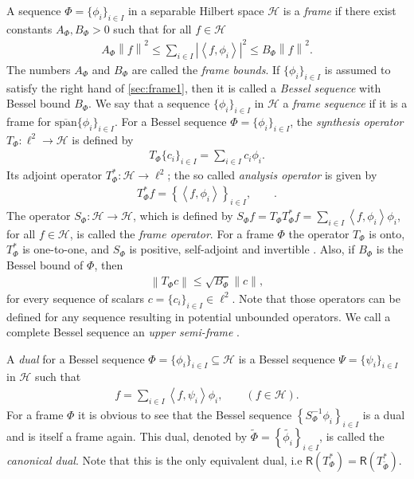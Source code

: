 \documentclass{birkjour}
\theoremstyle{definition}
\theoremstyle{remark}
\numberwithin{equation}{section}
\newcommand{\range}[1]{\mathsf{R}\left( #1 \right)}
\def\Hil{\mathcal{H}}
\begin{document}
A sequence $\Phi=\{\phi_{i}\}_{i\in I}$ in a separable Hilbert space
$\mathcal{H}$ is a \textit{frame} if there exist constants $A_{\Phi},B_{\Phi}>0$
such that for all $f \in \Hil$ 
\begin{eqnarray} \label{sec:frame1}
A_{\Phi}\left\|f\right\|^{2}\leq \sum_{i\in I}\left|\left\langle f,\phi_{i}\right\rangle\right|^{2}\leq B_{\Phi}\left\|f\right\|^{2}.
\end{eqnarray}
The numbers $A_{\Phi}$ and $B_{\Phi}$ are called the \textit{frame bounds}. If $\{\phi_{i}\}_{i\in I}$ is assumed to satisfy the right hand of \eqref{sec:frame1}, then it is called a \textit{Bessel sequence} with Bessel bound $B_{\Phi}$. We say that a sequence $\{\phi_{i}\}_{i\in I}$ in $\mathcal{H}$ a \textit{frame sequence} if it is a frame for $\overline{\textrm{span}}\{\phi_{i}\}_{i\in I}$.
For a Bessel sequence $\Phi=\{\phi_{i}\}_{i\in I}$, the \textit{synthesis operator} $T_{\Phi}:\ell^{2}\rightarrow \mathcal{H}$ is defined by
\begin{eqnarray*}
T_{\Phi}\{c_{i}\}_{i\in I}=\sum_{i\in I}c_{i}\phi_{i}.
\end{eqnarray*}
 Its adjoint operator $T_{\Phi}^{*}:\mathcal{H}\rightarrow \ell^{2}$; the so called  \textit{analysis operator}  is given by
 \begin{eqnarray*}
 T_{\Phi}^{*}f=\left\{\left\langle f,\phi_{i}\right\rangle\right\}_{i\in I},\qquad.
 \end{eqnarray*}
The operator $S_{\Phi}:\mathcal{H}\rightarrow \mathcal{H}$,
which is defined by $S_{\Phi}f=T_{\Phi}T_{\Phi}^{*}f=\sum_{i\in I}\left\langle f,\phi_{i}\right\rangle \phi_{i}$, for all $f\in \mathcal{H}$, is called the \textit{frame operator}.
For a frame ${\Phi}$ the operator {$T_{\Phi}$}  is onto, {$T^*_{\Phi}$} is one-to-one, and ${S_{\Phi}}$ is positive, self-adjoint and invertible \cite{Chr08}. Also, if $B_{\Phi}$ is the Bessel bound of $\Phi$, then
 \begin{eqnarray*}
\left\|T_{\Phi}c\right\|\leq \sqrt{B_{\Phi}} \|c\|, 
    \end{eqnarray*}
   for every sequence of scalars $c=\{c_{i}\}_{i\in I} \in \ell^2$. Note that those operators can be defined for any sequence \cite{xxlstoeant11} resulting in potential  unbounded operators.
    We call a complete Bessel sequence an \textit{upper semi-frame} \cite{jpaxxl09,antbal12}.

A \textit{dual} for a Bessel sequence $\Phi=\{\phi_{i}\}_{i\in I}\subseteq \mathcal{H}$ is a Bessel sequence $\Psi=\{\psi_{i}\}_{i\in I}$ in $\mathcal{H}$ such that
\begin{eqnarray*}\label{dual}
f=\sum_{i\in I}\left\langle f,\psi_{i}\right\rangle \phi_{i},\qquad(f\in \mathcal{H}). 
\end{eqnarray*}
For a frame $\Phi$ it is obvious to see that the Bessel sequence $\left\{S_{\Phi}^{-1}\phi_{i}\right\}_{i\in I}$ is a dual and is itself a frame again. This dual, denoted by $\widetilde{\Phi}=\left\{\widetilde{\phi_{i}}\right\}_{i\in I}$, is called the \textit{canonical dual}.
Note that this is the only equivalent dual, i.e $\range{T^*_{\Phi}}=\range{T^*_{\widetilde{\Phi}}}$.
\end{document}
